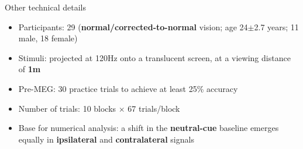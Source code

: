     \begin{frame}{Other technical details}
        \begin{itemize}
            \item<+-> Participants: 29 (\textcolor{lightlavender}{\textbf{normal/corrected-to-normal}} vision; age 24$\pm$2.7 years; 11 male, 18 female)
            \item<+-> Stimuli: projected at 120Hz onto a translucent screen, at a viewing distance of \textcolor{lightlavender}{\textbf{1m}}
            \item<+-> Pre-MEG: 30 practice trials to achieve at least 25\% accuracy
            \item<+-> Number of trials: 10 blocks $\times$ 67 trials/block
            \item<+-> Base for numerical analysis: a shift in the \textcolor{lightlavender}{\textbf{neutral-cue}} baseline emerges equally in \textcolor{lightlavender}{\textbf{ipsilateral}} and \textcolor{lightlavender}{\textbf{contralateral}} signals
        \end{itemize}
        
    \end{frame}
